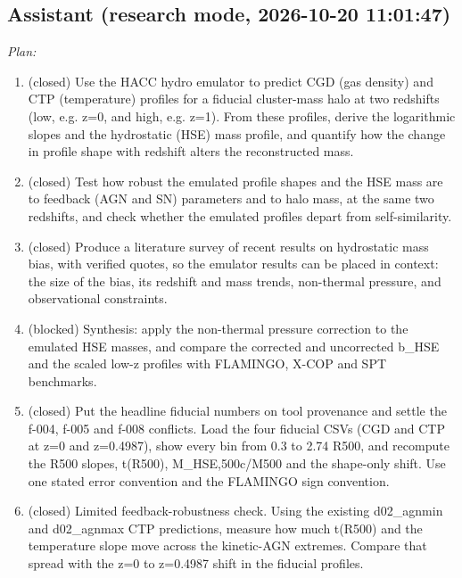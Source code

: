 \documentclass[11pt,a4paper]{article}
\begin{document}
\subsection*{Assistant \small(research mode, 2026-10-20 11:01:47)}
\textit{Plan:}\begin{enumerate}
  \item (closed) Use the HACC hydro emulator to predict CGD (gas density) and CTP (temperature) profiles for a fiducial cluster-mass halo at two redshifts (low, e.g. z=0, and high, e.g. z=1). From these profiles, derive the logarithmic slopes and the hydrostatic (HSE) mass profile, and quantify how the change in profile shape with redshift alters the reconstructed mass.
  \item (closed) Test how robust the emulated profile shapes and the HSE mass are to feedback (AGN and SN) parameters and to halo mass, at the same two redshifts, and check whether the emulated profiles depart from self-similarity.
  \item (closed) Produce a literature survey of recent results on hydrostatic mass bias, with verified quotes, so the emulator results can be placed in context: the size of the bias, its redshift and mass trends, non-thermal pressure, and observational constraints.
  \item (blocked) Synthesis: apply the non-thermal pressure correction to the emulated HSE masses, and compare the corrected and uncorrected b\_HSE and the scaled low-z profiles with FLAMINGO, X-COP and SPT benchmarks.
  \item (closed) Put the headline fiducial numbers on tool provenance and settle the f-004, f-005 and f-008 conflicts. Load the four fiducial CSVs (CGD and CTP at z=0 and z=0.4987), show every bin from 0.3 to 2.74 R500, and recompute the R500 slopes, t(R500), M\_HSE,500c/M500 and the shape-only shift. Use one stated error convention and the FLAMINGO sign convention.
  \item (closed) Limited feedback-robustness check. Using the existing d02\_agnmin and d02\_agnmax CTP predictions, measure how much t(R500) and the temperature slope move across the kinetic-AGN extremes. Compare that spread with the z=0 to z=0.4987 shift in the fiducial profiles.
\end{enumerate}
\end{document}
